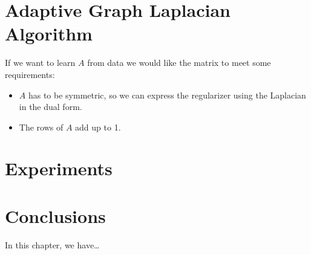 


\section{Adaptive Graph Laplacian Algorithm}

If we want to learn $A$ from data we would like the matrix to meet some requirements:
\begin{itemize}
    \item $A$ has to be symmetric, so we can express the regularizer using the Laplacian in the dual form.
    \item The rows of $A$ add up to 1. 
\end{itemize} 

\section{Experiments}

\section{Conclusions}\label{sec-conclusions-4}

In this chapter, we have\dots
